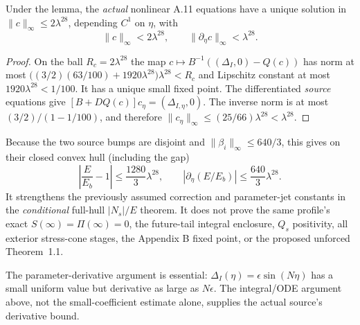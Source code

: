 \begin{theorem}
\label{thm:a11-rootjet-new}
Under the lemma, the \emph{actual} nonlinear A.11 equations
have a unique solution in $\|c\|_\infty\le2\lambda^{28}$,
depending $C^1$ on $\eta$, with
\[
 \|c\|_\infty<2\lambda^{28},\qquad
 \|\partial_\eta c\|_\infty<\lambda^{28}.
\]
\end{theorem}
\begin{proof}
On the ball $R_c=2\lambda^{28}$ the map
$c\mapsto B^{-1}((\Delta_I,0)-Q(c))$ has norm at most
$\bigl((3/2)(63/100)+1920\lambda^{28}\bigr)\lambda^{28}
<R_c$ and Lipschitz constant at most
$1920\lambda^{28}<1/100$. It has a unique small fixed
point. The differentiated \emph{source} equations give
$[B+DQ(c)]c_\eta=(\Delta_{I,\eta},0)$.
The inverse norm is at most
$(3/2)/(1-1/100)$, and therefore
$\|c_\eta\|_\infty\le(25/66)\lambda^{28}
<\lambda^{28}$.
\end{proof}

Because the two source bumps are disjoint and
$\|\beta_i\|_\infty\le640/3$, this gives on their
closed convex hull (including the gap)
\[
 \left|\frac{E}{E_b}-1\right|
 \le\frac{1280}{3}\lambda^{28},\qquad
 \left|\partial_\eta(E/E_b)\right|
 \le\frac{640}{3}\lambda^{28}.
\]
It strengthens the previously assumed correction and
parameter-jet constants in the \emph{conditional}
full-hull $|N_s|/E$ theorem. It does not prove the
same profile's exact $S(\infty)=\Pi(\infty)=0$,
the future-tail integral enclosure, $Q_s$ positivity,
all exterior stress-cone stages, the Appendix B fixed
point, or the proposed unforced Theorem~1.1.

The parameter-derivative argument is essential:
$\Delta_I(\eta)=\epsilon\sin(N\eta)$ has a small
uniform value but derivative as large as $N\epsilon$.
The integral/ODE argument above, not the
small-coefficient estimate alone, supplies the
actual source's derivative bound.
